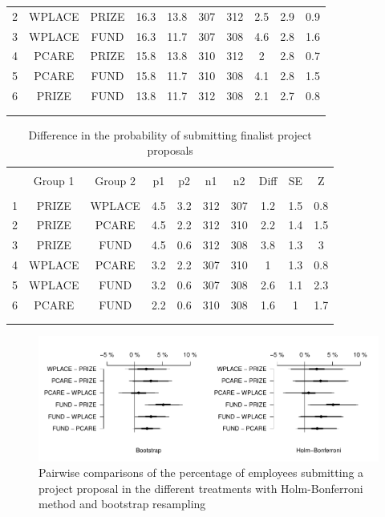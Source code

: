 \documentclass[12pt, titlepage]{article}
\begin{document}
\begin{table}
\begin{tabular}{@{}lccccccccc}
  2 & WPLACE & PRIZE & 16.3 & 13.8 & 307 & 312 & 2.5 & 2.9 & 0.9 \\ 
  3 & WPLACE & FUND & 16.3 & 11.7 & 307 & 308 & 4.6 & 2.8 & 1.6 \\ 
  4 & PCARE & PRIZE & 15.8 & 13.8 & 310 & 312 & 2 & 2.8 & 0.7 \\ 
  5 & PCARE & FUND & 15.8 & 11.7 & 310 & 308 & 4.1 & 2.8 & 1.5 \\ 
  6 & PRIZE & FUND & 13.8 & 11.7 & 312 & 308 & 2.1 & 2.7 & 0.8 \\ 
   \\[-1.8ex]\hline \hline \\[-1.8ex]
\end{tabular}
\end{table}\begin{table}
\centering
\caption{Difference in the probability of submitting finalist project proposals}
\label{app: finalist}
\begin{tabular}{@{}lccccccccc}
  \\[-1.8ex]\hline \hline \\[-1.8ex]
 & Group 1 & Group 2 & p1 & p2 & n1 & n2 & Diff & SE & Z \\ 
  \hline \\[-1.86ex]
1 & PRIZE & WPLACE & 4.5 & 3.2 & 312 & 307 & 1.2 & 1.5 & 0.8 \\ 
  2 & PRIZE & PCARE & 4.5 & 2.2 & 312 & 310 & 2.2 & 1.4 & 1.5 \\ 
  3 & PRIZE & FUND & 4.5 & 0.6 & 312 & 308 & 3.8 & 1.3 & 3 \\ 
  4 & WPLACE & PCARE & 3.2 & 2.2 & 307 & 310 & 1 & 1.3 & 0.8 \\ 
  5 & WPLACE & FUND & 3.2 & 0.6 & 307 & 308 & 2.6 & 1.1 & 2.3 \\ 
  6 & PCARE & FUND & 2.2 & 0.6 & 310 & 308 & 1.6 & 1 & 1.7 \\ 
   \\[-1.8ex]\hline \hline \\[-1.8ex]
\end{tabular}
\end{table}

\begin{figure} 
  \centering
  \caption{Pairwise comparisons of the percentage of employees submitting a project proposal in the different treatments with Holm-Bonferroni method and bootstrap resampling}
  \label{fig: participation}
  \includegraphics{Figures/pairwise-robust-1.pdf}
\end{figure}
\end{document}
